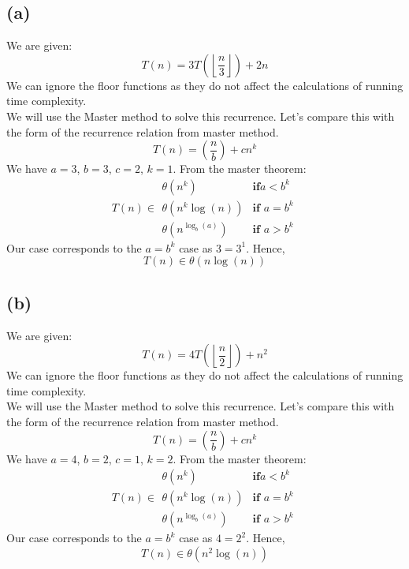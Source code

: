 \documentclass[a4paper,12pt]{article} %
\begin{document}
\subsection*{(a)}
We are given:
\begin{equation*}
    T(n) = 3T\left(\left \lfloor \frac{n}{3} \right \rfloor \right) + 2n
\end{equation*}
We can ignore the floor functions as they do not affect the calculations of running time complexity.\\
We will use the Master method to solve this recurrence. Let's compare this with the form of the recurrence relation from master method.
\begin{equation*}
    T(n) = \left(\frac{n}{b}\right) + cn^k
\end{equation*}
We have $a = 3$, $b = 3$, $c = 2$, $k = 1$. From the master theorem:
\begin{equation*}
    T(n) \in \begin{array}{ll}
      \theta(n^k) &\textbf{if} a < b^k\\
      \theta(n^k\log(n)) &\textbf{if } a = b^k\\
      \theta(n^{\log_b(a)}) &\textbf{if } a > b^k
\end{array}
\end{equation*}
Our case corresponds to the $a = b^k$ case as $3 = 3^1$. Hence,
\begin{equation*}
    T(n) \in \theta(n\log(n))
\end{equation*}

\subsection*{(b)}
We are given:
\begin{equation*}
    T(n) = 4T\left(\left \lfloor \frac{n}{2} \right \rfloor \right) + n^2
\end{equation*}
We can ignore the floor functions as they do not affect the calculations of running time complexity.\\
We will use the Master method to solve this recurrence. Let's compare this with the form of the recurrence relation from master method.
\begin{equation*}
    T(n) = \left(\frac{n}{b}\right) + cn^k
\end{equation*}
We have $a = 4$, $b = 2$, $c = 1$, $k = 2$. From the master theorem:
\begin{equation*}
    T(n) \in \begin{array}{ll}
      \theta(n^k) &\textbf{if} a < b^k\\
      \theta(n^k\log(n)) &\textbf{if } a = b^k\\
      \theta(n^{\log_b(a)}) &\textbf{if } a > b^k
\end{array}
\end{equation*}
Our case corresponds to the $a = b^k$ case as $4 = 2^2$. Hence,
\begin{equation*}
    T(n) \in \theta(n^2 \log(n))
\end{equation*}
\end{document}
